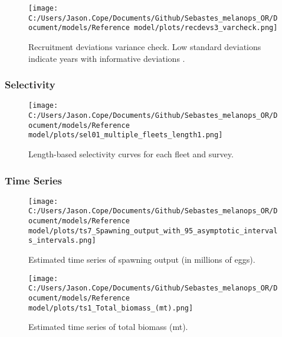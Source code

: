 \documentclass[11pt,
  english,
  letterpaper,
]{article}
\begin{document}
\newpage

\begin{figure}
\centering
\texttt{[image: C:/Users/Jason.Cope/Documents/Github/Sebastes\_melanops\_OR/Document/models/Reference model/plots/recdevs3\_varcheck.png]}
\caption{Recruitment deviations variance check. Low standard deviations indicate years with informative deviations .\label{fig:varcheck}}
\end{figure}

\newpage

\hypertarget{selectivity}{%
\subsubsection{Selectivity}\label{selectivity}}

\begin{figure}
\centering
\texttt{[image: C:/Users/Jason.Cope/Documents/Github/Sebastes\_melanops\_OR/Document/models/Reference model/plots/sel01\_multiple\_fleets\_length1.png]}
\caption{Length-based selectivity curves for each fleet and survey.\label{fig:fleet-selectivity}}
\end{figure}

\newpage

\hypertarget{time-series}{%
\subsubsection{Time Series}\label{time-series}}

\begin{figure}
\centering
\texttt{[image: C:/Users/Jason.Cope/Documents/Github/Sebastes\_melanops\_OR/Document/models/Reference model/plots/ts7\_Spawning\_output\_with\_95\_asymptotic\_intervals\_intervals.png]}
\caption{Estimated time series of spawning output (in millions of eggs).\label{fig:ssb}}
\end{figure}

\newpage

\begin{figure}
\centering
\texttt{[image: C:/Users/Jason.Cope/Documents/Github/Sebastes\_melanops\_OR/Document/models/Reference model/plots/ts1\_Total\_biomass\_(mt).png]}
\caption{Estimated time series of total biomass (mt).\label{fig:tot-bio}}
\end{figure}

\newpage
\end{document}
